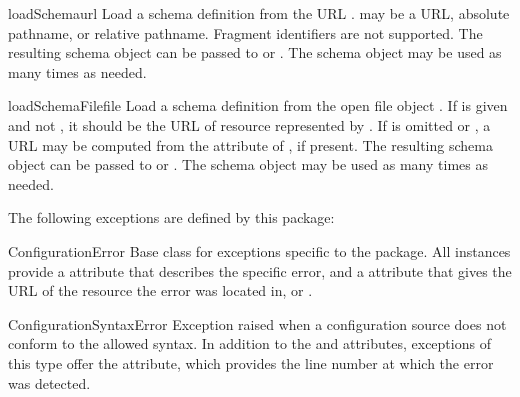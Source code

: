 \documentclass{howto}
\begin{document}
\begin{funcdesc}{loadSchema}{url}
  Load a schema definition from the URL .
   may be a URL, absolute pathname, or relative pathname.
  Fragment identifiers are not supported.
  The resulting
  schema object can be passed to  or
  .  The schema object may be used as many
  times as needed.
\end{funcdesc}

\begin{funcdesc}{loadSchemaFile}{file}
  Load a schema definition from the open file object .  If
   is given and not , it should be the URL of
  resource represented by .  If  is omitted or
  , a URL may be computed from the  attribute
  of , if present.  The resulting schema object can
  be passed to  or .
  The schema object may be used as many times as needed.
\end{funcdesc}

The following exceptions are defined by this package:

\begin{excdesc}{ConfigurationError}
  Base class for exceptions specific to the  package.
  All instances provide a  attribute that describes
  the specific error, and a  attribute that gives the URL
  of the resource the error was located in, or .
\end{excdesc}

\begin{excdesc}{ConfigurationSyntaxError}
  Exception raised when a configuration source does not conform to the
  allowed syntax.  In addition to the  and
   attributes, exceptions of this type offer the
   attribute, which provides the line number at which
  the error was detected.
\end{excdesc}
\end{document}
